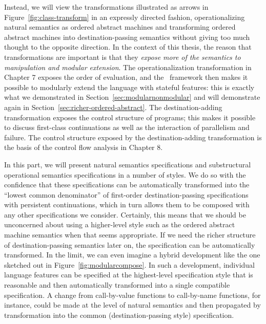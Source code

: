 Instead, we will view the transformations illustrated as arrows in
Figure~\ref{fig:class-transform} in an expressly directed fashion,
operationalizing natural semantics as ordered abstract machines and
transforming ordered abstract machines into destination-passing
semantics without giving too much thought to the opposite
direction. In the context of this thesis, the reason that
transformations are important is that they {\it expose more of the
  semantics to manipulation and modular extension}.  The
operationalization transformation in Chapter 7 exposes the order of
evaluation, and the \sls~framework then makes it possible to modularly
extend the language with stateful features: this is exactly what we
demonstrated in Section~\ref{sec:modularnonmodular} and will
demonstrate again in Section~\ref{sec:richer-ordered-abstract}.  The
destination-adding transformation exposes the control structure of
programs; this makes it possible to discuss first-class continuations
as well as the interaction of parallelism and failure.  The control
structure exposed by the destination-adding transformation is the
basis of the control flow analysis in Chapter 8. 

In this part, we will present natural semantics specifications and
substructural operational semantics specifications in a number of
styles. We do so with the confidence that these specifications can be
automatically transformed into the ``lowest common denominator'' of
first-order destination-passing specifications with persistent
continuations, which in turn allows them to be composed with any other
specifications we consider. Certainly, this means that we should be
unconcerned about using a higher-level style such as the ordered
abstract machine semantics when that seems appropriate. If we need the
richer structure of destination-passing semantics later on, the
specification can be automatically transformed. In the limit, we can
even imagine a hybrid development like the one sketched out in
Figure~\ref{fig:modularcompose}. In such a development, individual
language features can be specified at the highest-level specification
style that is reasonable and then automatically transformed into a
single compatible specification. A change from call-by-value functions
to call-by-name functions, for instance, could be made at the level of
natural semantics and then propagated by transformation into the
common (destination-passing style) specification.



